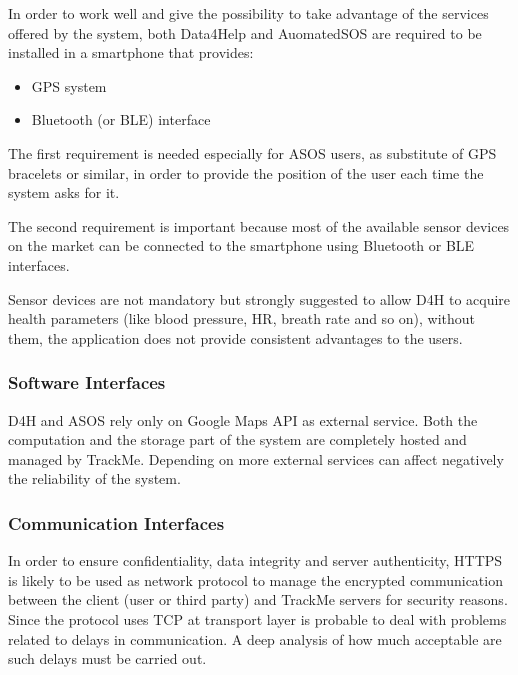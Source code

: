 In order to work well and give the possibility to take advantage of the services offered by the system, both Data4Help and AuomatedSOS are required to be installed in a smartphone that provides:
\begin{itemize}
	\item GPS system
	\item Bluetooth (or BLE) interface
\end{itemize} 
The first requirement is needed especially for ASOS users, as substitute of GPS bracelets or similar, in order to provide the position of the user each time the system asks for it.\par
The second requirement is important because most of the available sensor devices on the market can be connected to the smartphone using Bluetooth or BLE interfaces.\par
Sensor devices are not mandatory but strongly suggested to allow D4H to acquire health parameters (like blood pressure, HR, breath rate and so on), without them, the application does not provide consistent advantages to the users. 
\paragraph{}


{\color{Blue}\subsubsection{Software Interfaces}}
D4H and ASOS rely only on Google Maps API as external service. Both the computation and the storage part of the system are completely hosted and managed by TrackMe. Depending on more external services can affect negatively the reliability of the system. \par
\paragraph{}


{\color{Blue}\subsubsection{Communication Interfaces}}
In order to ensure confidentiality, data integrity and server authenticity, HTTPS is likely to be used as network protocol to manage the encrypted communication between the client (user or third party) and TrackMe servers for security reasons. Since the protocol uses TCP at transport layer is probable to deal with problems related to delays in communication. A deep analysis of how much acceptable are such delays must be carried out.
